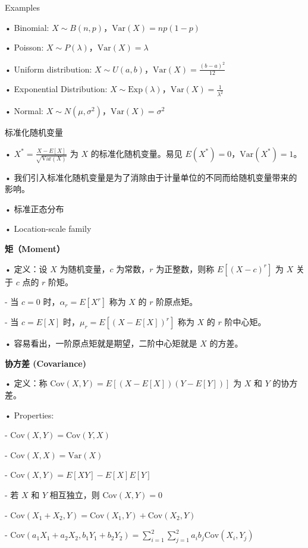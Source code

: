 \documentclass[UTF8]{report}
\theoremstyle{MyLineTheoremStyle} %
\theoremstyle{MyBlockTheoremStyle} %
\theoremstyle{MySubsubsectionStyle} %
\begin{document}
Examples\par
• Binomial: $X \sim B(n, p)$，$\text{Var}(X) = np(1 - p)$\par
• Poisson: $X \sim P(\lambda)$，$\text{Var}(X) = \lambda$\par
• Uniform distribution: $X \sim U(a, b)$，$\text{Var}(X) = \frac{(b - a)^2}{12}$\par
• Exponential Distribution: $X \sim \text{Exp}(\lambda)$，$\text{Var}(X) = \frac{1}{\lambda^2}$\par
• Normal: $X \sim N(\mu, \sigma^2)$，$\text{Var}(X) = \sigma^2$\par

\vspace{1cm}

标准化随机变量\par
• $X^* = \frac{X - E[X]}{\sqrt{\text{Var}(X)}}$ 为 $X$ 的标准化随机变量。易见 $E(X^*) = 0$，$\text{Var}(X^*) = 1$。\par
• 我们引入标准化随机变量是为了消除由于计量单位的不同而给随机变量带来的影响。\par
• 标准正态分布\par
• Location-scale family\par

\vspace{1cm}

\textbf{矩（Moment）}\par
• 定义：设 $X$ 为随机变量，$c$ 为常数，$r$ 为正整数，则称 $E[(X - c)^r]$ 为 $X$ 关于 $c$ 点的 $r$ 阶矩。\par
  - 当 $c = 0$ 时，$\alpha_r = E[X^r]$ 称为 $X$ 的 $r$ 阶原点矩。\par
  - 当 $c = E[X]$ 时，$\mu_r = E[(X - E[X])^r]$ 称为 $X$ 的 $r$ 阶中心矩。\par
• 容易看出，一阶原点矩就是期望，二阶中心矩就是 $X$ 的方差。\par

\vspace{1cm}

\textbf{协方差 (Covariance)}\par
• 定义：称 $ \text{Cov}(X, Y) = E[(X - E[X])(Y - E[Y])]$ 为 $X$ 和 $Y$ 的协方差。\par
• Properties:\par
  - $\text{Cov}(X, Y) = \text{Cov}(Y, X)$\par
  - $\text{Cov}(X, X) = \text{Var}(X)$\par
  - $\text{Cov}(X, Y) = E[XY] - E[X]E[Y]$\par
  - 若 $X$ 和 $Y$ 相互独立，则 $\text{Cov}(X, Y) = 0$\par
  - $\text{Cov}(X_1 + X_2, Y) = \text{Cov}(X_1, Y) + \text{Cov}(X_2, Y)$\par
  - $\text{Cov}(a_1 X_1 + a_2 X_2, b_1 Y_1 + b_2 Y_2) = \sum_{i=1}^{2} \sum_{j=1}^{2} a_i b_j \text{Cov}(X_i, Y_j)$\par
\end{document}
